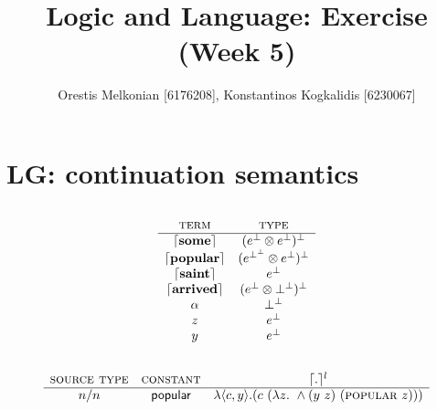 \documentclass[]{article}
\title{\textbf{Logic and Language: Exercise (Week 5)}}
\author{Orestis Melkonian [6176208], Konstantinos Kogkalidis [6230067]}
\date{}
\newcommand{\CPS}[1]{\lceil#1\rceil}
\newcommand{\tsc}{\textsc}
\newcommand{\ceil}[1]{\lceil #1 \rceil}
\newcommand{\w}[1]{\ceil{\mathbf{#1}}}
\begin{document}
\maketitle
\section{LG: continuation semantics}
\subsection{}
\[\begin{array}{cc}
\textsc{term} & \textsc{type}\\
\hline
\w{some} & (e^\bot \otimes e^\bot)^\bot \\
\w{popular} & (e^{\bot^\bot} \otimes e^\bot)^\bot \\
\w{saint} & e^\bot \\
\w{arrived} & (e^\bot \otimes \bot^{\bot})^\bot \\
\alpha & \bot^\bot \\
z & e^\bot \\
y & e^\bot \\
\end{array}\]
\subsection{}
\[\begin{array}{ccc}
\textsc{source type} & \textsc{constant} & \CPS{.}^l\\
\hline 
n/n & \textsf{popular} & \lambda\langle c,y \rangle. (c\ (\lambda z.\ \wedge (y\ z)\ (\tsc{popular}\ z)))\\
\end{array}\]
\end{document}
